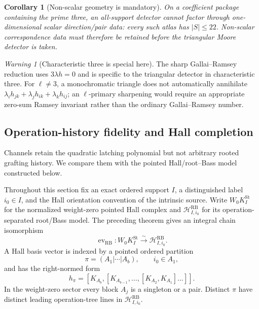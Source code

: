\documentclass[11pt]{article}
\newtheorem{corollary}[theorem]{Corollary}
\theoremstyle{remark}
\newtheorem{warning}[theorem]{Warning}
\begin{document}
\begin{corollary}[Non-scalar geometry is mandatory]
\label{P2M-cor:nonscalar-mandatory}
On a coefficient package containing the prime three, an all-support detector
cannot factor through one-dimensional scalar direction/pair data: every such
atlas has \(|S|\le22\).  Non-scalar correspondence data must therefore be
retained before the triangular Moore detector is taken.
\end{corollary}

\begin{warning}[Characteristic three is special here]
\label{P2M-warn:scalar-prime-three}
The sharp Gallai--Ramsey reduction uses
\(3\lambda h=0\) and is specific to the triangular detector in
characteristic three.  For \(\ell\ne3\), a monochromatic triangle does not
automatically annihilate
\(\lambda_i h_{jk}+\lambda_jh_{ik}+\lambda_kh_{ij}\); an
\(\ell\)-primary sharpening would require an appropriate zero-sum Ramsey
invariant rather than the ordinary Gallai--Ramsey number.
\end{warning}


\subsection{Operation-history fidelity and Hall completion}

Channels retain the quadratic latching polynomial but not arbitrary
rooted grafting history.  We compare them with the pointed Hall/root--Bass model constructed below.

Throughout this section fix an exact ordered support $I$, a distinguished label
$i_0\in I$, and the Hall orientation convention of the intrinsic source.  Write
$W_0K_I^{\mathrm{St}}$ for the normalized weight-zero pointed Hall complex and
$\mathscr H_{I,i_0}^{\mathrm{RB}}$ for its operation-separated root/Bass model.
The preceding theorem gives an integral chain isomorphism
\begin{equation}\label{P2M-eq:v14-preceding-hall-iso}
 \operatorname{ev}_{\mathrm{RB}}:
 W_0K_I^{\mathrm{St}}
 \xrightarrow{\ \sim\ }
 \mathscr H_{I,i_0}^{\mathrm{RB}}.
\end{equation}
A Hall basis vector is indexed by a pointed ordered partition
\[
 \pi=(A_1|\cdots|A_b),\qquad i_0\in A_1,
\]
and has the right-normed form
\begin{equation}\label{P2M-eq:v14-hall-word}
 h_\pi=[K_{A_b},[K_{A_{b-1}},\ldots,[K_{A_2},K_{A_1}]\ldots]].
\end{equation}
In the weight-zero sector every block $A_j$ is a singleton or a pair.  Distinct
$\pi$ have distinct leading operation-tree lines in
$\mathscr H_{I,i_0}^{\mathrm{RB}}$.
\end{document}
